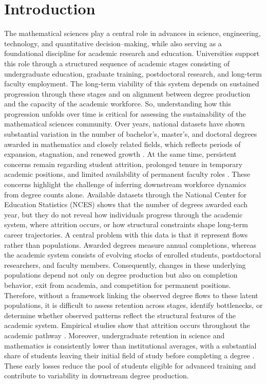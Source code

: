 \documentclass[3p]{elsarticle}%
\theoremstyle{definition}
\begin{document}
\section{Introduction}
 \noindent The mathematical sciences play a central role in advances in science, engineering, technology, and quantitative decision--making, while also serving as a foundational discipline for academic research and education. Universities support this role through a structured sequence of academic stages consisting of undergraduate education, graduate training, postdoctoral research, and long-term faculty employment. The long-term viability of this system depends on sustained progression through these stages and on alignment between degree production and the capacity of the academic workforce. So, understanding how this progression unfolds over time is critical for assessing the sustainability of the mathematical sciences community. Over years, national datasets have shown substantial variation in the number of bachelor’s, master’s, and doctoral degrees awarded in mathematics and closely related fields, which reflects periods of expansion, stagnation, and renewed growth \cite{NCESdegMath,falkenheim2023academic}. At the same time, persistent concerns remain regarding student attrition, prolonged tenure in temporary academic positions, and limited availability of permanent faculty roles \cite{powell2015future}. These concerns highlight the challenge of inferring downstream workforce dynamics from degree counts alone. Available datasets through the National Center for Education Statistics (NCES) shows that the number of degrees awarded each year, but they do not reveal how individuals progress through the academic system, where attrition occurs, or how structural constraints shape long-term career trajectories. A central problem with this data is that it represent flows rather than populations. Awarded degrees measure annual completions, whereas the academic system consists of evolving stocks of enrolled students, postdoctoral researchers, and faculty members. Consequently, changes in these underlying populations depend not only on degree production but also on completion behavior, exit from academia, and competition for permanent positions.\\
 
 \noindent Therefore, without a framework linking the observed degree flows to these latent populations, it is difficult to assess retention across stages, identify bottlenecks, or determine whether observed patterns reflect the structural features of the academic system. Empirical studies show that attrition occurs throughout the academic pathway \cite{LarsonGhaffarzadeganXue2014,FitzGeraldEtAl2023}. Moreover, undergraduate retention in science and mathematics is consistently lower than institutional averages, with a substantial share of students leaving their initial field of study before completing a degree \cite{correll1997talking,seymour1997talking,chen2013stem,NCESgradRates}. These early losses reduce the pool of students eligible for advanced training and contribute to variability in downstream degree production.\\
 
\end{document}
